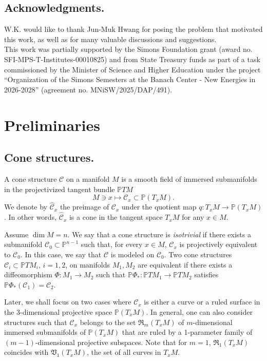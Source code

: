 \documentclass[11pt]{amsart}
\theoremstyle{definition}
\newcommand{\PP}{\mathbb{P}}
\newcommand{\CC}{\mathcal{C}}
\begin{document}
\subsection*{Acknowledgments.}
W.K. would like to thank Jun-Muk Hwang for posing the problem that motivated this work, as well as for many valuable discussions and suggestions.\\
This work was partially supported by the Simons Foundation grant (award no. SFI-MPS-T-Institutes-00010825) and from State Treasury funds as part of a task commissioned by the Minister of Science and Higher Education under the project “Organization of the Simons Semesters at the Banach Center - New Energies in 2026-2028” (agreement no. MNiSW/2025/DAP/491).

\section{Preliminaries}
\subsection{Cone structures.}
A cone structure $\CC$ on a manifold $M$ is a smooth field of immersed submanifolds in the projectivized tangent bundle $\PP TM$
\[
M \ni x \mapsto \CC_x \subset \PP(T_x M).
\]  
We denote by $\hat{\CC}_x$ the preimage of $\CC_x$ under the quotient map $q\colon T_x M \to \PP(T_x M)$. In other words, $\hat{\CC}_x$ is a cone in the tangent space $T_x M$ for any $x \in M$.

Assume $\dim M=n$. We say that a cone structure is \emph{isotrivial} if there exists a submanifold $\CC_0 \subset \PP^{n-1}$ such that, for every $x \in M$, $\CC_x$ is projectively equivalent to $\CC_0$. In this case, we say that $\CC$ is modeled on $\CC_0$. Two cone structures $\CC_i\subset \PP TM_i$, $i=1,2$, on manifolds $M_1,M_2$ are equivalent if there exists a diffeomorphism $\Phi\colon M_1\rightarrow M_2$ such that $\PP\Phi_*\colon\PP TM_1\to \PP TM_2$ satisfies $\PP\Phi_*(\CC_1)=\CC_2$. 

Later, we shall focus on two cases where $\CC_x$ is either a curve or a ruled surface in the 3-dimensional projective space $\PP(T_x M)$. In general, one can also consider structures such that $\CC_x$ belongs to the set $\mathfrak{R}_m(T_x M)$ of $m$-dimensional immersed submanifolds of $\PP(T_x M)$ that are ruled by a 1-parameter family of $(m-1)$-dimensional projective subspaces. Note that for $m=1$, $\mathfrak{R}_1(T_x M)$ coincides with $\mathfrak{V}_1(T_x M)$, the set of all  curves in $T_x M$.
\end{document}
